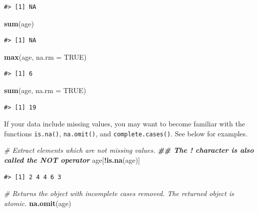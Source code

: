 \documentclass[
]{book}
\newenvironment{Shaded}{\begin{snugshade}}{\end{snugshade}}
\newcommand{\AttributeTok}[1]{\textcolor[rgb]{0.13,0.29,0.53}{#1}}
\newcommand{\CommentTok}[1]{\textcolor[rgb]{0.56,0.35,0.01}{\textit{#1}}}
\newcommand{\ConstantTok}[1]{\textcolor[rgb]{0.56,0.35,0.01}{#1}}
\newcommand{\DocumentationTok}[1]{\textcolor[rgb]{0.56,0.35,0.01}{\textbf{\textit{#1}}}}
\newcommand{\FunctionTok}[1]{\textcolor[rgb]{0.13,0.29,0.53}{\textbf{#1}}}
\newcommand{\NormalTok}[1]{#1}
\newcommand{\SpecialCharTok}[1]{\textcolor[rgb]{0.81,0.36,0.00}{\textbf{#1}}}
\begin{document}
\begin{verbatim}
#> [1] NA
\end{verbatim}

\begin{Shaded}
\begin{Highlighting}[]
\FunctionTok{sum}\NormalTok{(age)}
\end{Highlighting}
\end{Shaded}

\begin{verbatim}
#> [1] NA
\end{verbatim}

\begin{Shaded}
\begin{Highlighting}[]
\FunctionTok{max}\NormalTok{(age, }\AttributeTok{na.rm =} \ConstantTok{TRUE}\NormalTok{)}
\end{Highlighting}
\end{Shaded}

\begin{verbatim}
#> [1] 6
\end{verbatim}

\begin{Shaded}
\begin{Highlighting}[]
\FunctionTok{sum}\NormalTok{(age, }\AttributeTok{na.rm =} \ConstantTok{TRUE}\NormalTok{)}
\end{Highlighting}
\end{Shaded}

\begin{verbatim}
#> [1] 19
\end{verbatim}

If your data include missing values, you may want to become familiar with the
functions \texttt{is.na()}, \texttt{na.omit()}, and \texttt{complete.cases()}. See below for
examples.

\begin{Shaded}
\begin{Highlighting}[]
\CommentTok{\# Extract elements which are not missing values.}
\DocumentationTok{\#\# The ! character is also called the NOT operator}
\NormalTok{age[}\SpecialCharTok{!}\FunctionTok{is.na}\NormalTok{(age)]}
\end{Highlighting}
\end{Shaded}

\begin{verbatim}
#> [1] 2 4 4 6 3
\end{verbatim}

\begin{Shaded}
\begin{Highlighting}[]
\CommentTok{\# Returns the object with incomplete cases removed. The returned object is atomic.}
\FunctionTok{na.omit}\NormalTok{(age)}
\end{Highlighting}
\end{Shaded}
\end{document}
